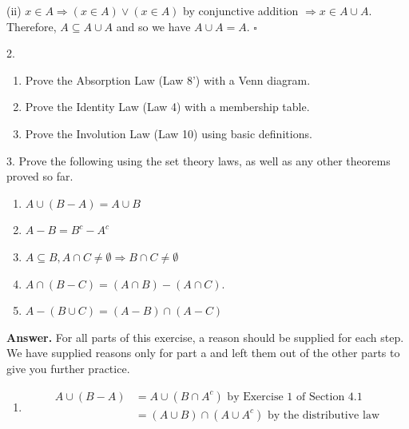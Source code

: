 \documentclass[10pt,]{book}
\theoremstyle{plain}
\theoremstyle{definition}
\theoremstyle{definition}
\theoremstyle{definition}
\begin{document}
\begin{exercisegroup}
\begin{enumerate}[label=\alph*]
(ii) \(x\in A\Rightarrow (x\in A) \lor (x\in A)\) by conjunctive addition
           \(\Rightarrow  x\in A\cup A\).
Therefore, \(A \subseteq A\cup A\) and so we have \(A\cup A=A\). \(\square\)\end{enumerate}
%
\item[2.]\hypertarget{exercise-7}{}\leavevmode%
\begin{enumerate}[label=\alph*]
\item\hypertarget{li-29}{}Prove the Absorption Law (Law 8') with a Venn diagram.%
\item\hypertarget{li-30}{}Prove the Identity Law (Law 4) with a membership table.%
\item\hypertarget{li-31}{}Prove the Involution Law (Law 10) using basic definitions.%
\end{enumerate}
%
\par\smallskip
\item[3.]\hypertarget{exercise-8}{}Prove the following using the set theory laws, as well as any other theorems proved so far.%
\par
\leavevmode%
\begin{enumerate}[label=\alph*]
\item\hypertarget{li-32}{}  \(A \cup  (B - A) = A \cup  B\)%
\item\hypertarget{li-33}{}  \(A - B = B^c - A ^c\)%
\item\hypertarget{li-34}{}  \(A\subseteq B, A\cap C \neq \emptyset  \Rightarrow  B\cap C \neq \emptyset\)%
\item\hypertarget{li-35}{}  \(A\cap (B - C) = (A\cap B) - (A\cap C)\).%
\item\hypertarget{li-36}{}  \(A - (B \cup  C) = (A - B)\cap (A - C)\)%
\end{enumerate}
%
\par\smallskip
\par\smallskip
\noindent\textbf{Answer.}\hypertarget{answer-4}{}\quad
 For all parts of this exercise, a reason should be supplied for each step. 
We have supplied reasons only for part a and left them out of the other parts to give you further practice.%
\par
\leavevmode%
\begin{enumerate}[label=\alph*]
\item\hypertarget{li-37}{}\begin{equation*}
\begin{split}
A \cup (B-A)&=A\cup (B \cap A^c) \textrm{  by Exercise 1 of Section 4.1}\\
            & =(A\cup B)\cap (A\cup A^c) \textrm{  by the distributive law}\\

\end{split}
\end{equation*}
\end{enumerate}
\end{exercisegroup}
\end{document}
